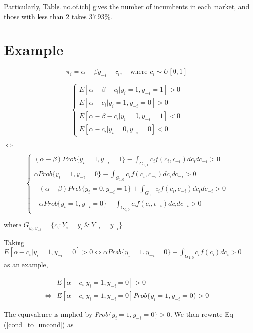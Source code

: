 \documentclass[a4paper]{article}
\begin{document}
Particularly, Table.\ref{no.of.icb} gives the number of incumbents in each market, and those with less than 2 takes $37.93\%$.



\section{Example}


$$\pi_i = \alpha - \beta y_{-i} - c_i, \quad \mbox{where } c_i \sim U[0,1]$$

$$\begin{cases}
E[\alpha - \beta - c_i | y_i = 1, y_{-i} = 1] > 0\\
E[\alpha - c_i | y_{i} = 1, y_{-i} = 0] > 0 \\
E[\alpha - \beta  - c_i | y_{i} = 0, y_{-i} = 1] < 0 \\
E[\alpha - c_i | y_{i} = 0, y_{-i} = 0] < 0
\end{cases}$$

$\Longleftrightarrow$

$$\begin{cases}
 (\alpha - \beta)Prob\{y_i = 1, y_{-i} = 1\} - \int_{G_{1,1}}c_if(c_i, c_{-i})dc_idc_{-i} > 0\\
 \alpha Prob\{y_i = 1, y_{-i} = 0\} - \int_{G_{1,0}}c_if(c_i, c_{-i})dc_idc_{-i}> 0\\
- (\alpha - \beta)Prob\{y_i = 0, y_{-i} = 1\} + \int_{G_{0,1}}c_if(c_i, c_{-i})dc_idc_{-i} > 0\\
- \alpha Prob\{y_i = 0, y_{-i} = 0\} + \int_{G_{0,0}}c_if(c_i, c_{-i})dc_idc_{-i} > 0
\end{cases}$$

where $G_{y_i, y_{-i}} = \{c_i:  Y_i = y_i \ \& \ Y_{-i} = y_{-i}\}$


Taking $E[\alpha  - c_i | y_i = 1, y_{-i} = 0] > 0 \Longleftrightarrow \alpha Prob\{y_i = 1, y_{-i} = 0\} - \int_{G_{1,0}}c_if(c_i)dc_i > 0$ as an example,

\begin{equation}
 \begin{array}{cl}
     &E[\alpha - c_i | y_i = 1, y_{-i} = 0] > 0\\
    \Longleftrightarrow&E[\alpha - c_i|y_i = 1, y_{-i} = 0]Prob\{y_i = 1, y_{-i} = 0\} > 0
\end{array}
\label{cond_to_uncond}
\end{equation}

The equivalence is implied by $Prob\{y_i = 1, y_{-i} = 0\} > 0$. We then rewrite Eq.(\ref{cond_to_uncond}) as
\end{document}
